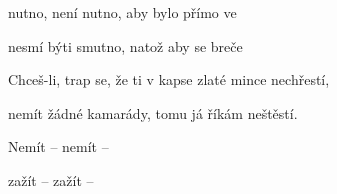 

\zr
{} nutno, není nutno, aby bylo přímo ve

 nesmí býti smutno, natož aby se breče 
\kr

\zs
Chceš-li, trap se, že ti v kapse zlaté mince nechřestí,

nemít žádné kamarády, tomu já říkám neštěstí.
\ks

\zs
Nemít  --  nemít  -- 

zažít  --  zažít  --  
\ks


\zr \kr

\zr \kr

\kp





